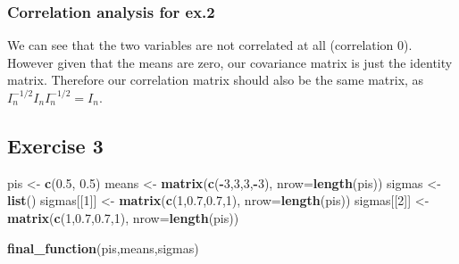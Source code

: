 \documentclass[]{article}
\newenvironment{Shaded}{\begin{snugshade}}{\end{snugshade}}
\newcommand{\DataTypeTok}[1]{\textcolor[rgb]{0.13,0.29,0.53}{#1}}
\newcommand{\DecValTok}[1]{\textcolor[rgb]{0.00,0.00,0.81}{#1}}
\newcommand{\FloatTok}[1]{\textcolor[rgb]{0.00,0.00,0.81}{#1}}
\newcommand{\KeywordTok}[1]{\textcolor[rgb]{0.13,0.29,0.53}{\textbf{#1}}}
\newcommand{\NormalTok}[1]{#1}
\newcommand{\OperatorTok}[1]{\textcolor[rgb]{0.81,0.36,0.00}{\textbf{#1}}}
\newcommand{\StringTok}[1]{\textcolor[rgb]{0.31,0.60,0.02}{#1}}
\begin{document}
\hypertarget{correlation-analysis-for-ex.2}{%
\subsubsection{Correlation analysis for
ex.2}\label{correlation-analysis-for-ex.2}}

We can see that the two variables are not correlated at all (correlation
0). However given that the means are zero, our covariance matrix is just
the identity matrix. Therefore our correlation matrix should also be the
same matrix, as \(I_{n}^{-1/2} I_{n} I_{n}^{-1/2} = I_{n}\).

\newpage

\hypertarget{exercise-3}{%
\subsection{Exercise 3}\label{exercise-3}}

\begin{Shaded}
\begin{Highlighting}[]
\NormalTok{pis <-}\StringTok{ }\KeywordTok{c}\NormalTok{(}\FloatTok{0.5}\NormalTok{, }\FloatTok{0.5}\NormalTok{)}
\NormalTok{means <-}\StringTok{ }\KeywordTok{matrix}\NormalTok{(}\KeywordTok{c}\NormalTok{(}\OperatorTok{-}\DecValTok{3}\NormalTok{,}\DecValTok{3}\NormalTok{,}\DecValTok{3}\NormalTok{,}\OperatorTok{-}\DecValTok{3}\NormalTok{), }\DataTypeTok{nrow=}\KeywordTok{length}\NormalTok{(pis))}
\NormalTok{sigmas <-}\StringTok{ }\KeywordTok{list}\NormalTok{()}
\NormalTok{sigmas[[}\DecValTok{1}\NormalTok{]] <-}\StringTok{ }\KeywordTok{matrix}\NormalTok{(}\KeywordTok{c}\NormalTok{(}\DecValTok{1}\NormalTok{,}\FloatTok{0.7}\NormalTok{,}\FloatTok{0.7}\NormalTok{,}\DecValTok{1}\NormalTok{), }\DataTypeTok{nrow=}\KeywordTok{length}\NormalTok{(pis))}
\NormalTok{sigmas[[}\DecValTok{2}\NormalTok{]] <-}\StringTok{ }\KeywordTok{matrix}\NormalTok{(}\KeywordTok{c}\NormalTok{(}\DecValTok{1}\NormalTok{,}\FloatTok{0.7}\NormalTok{,}\FloatTok{0.7}\NormalTok{,}\DecValTok{1}\NormalTok{), }\DataTypeTok{nrow=}\KeywordTok{length}\NormalTok{(pis))}
\end{Highlighting}
\end{Shaded}

\begin{Shaded}
\begin{Highlighting}[]
\KeywordTok{final_function}\NormalTok{(pis,means,sigmas)}
\end{Highlighting}
\end{Shaded}
\end{document}

